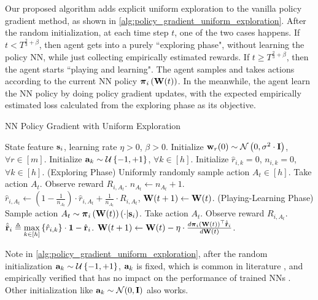 Our proposed algorithm adds explicit uniform exploration to the vanilla policy gradient method, as shown in \cref{alg:policy_gradient_uniform_exploration}. After the random initialization, at each time step $t$, one of the two cases happens. If $t < T^{\frac{2}{3} + \beta}$, then agent gets into a purely ``exploring phase", without learning the policy NN, while just collecting empirically estimated rewards. If $t \ge T^{\frac{2}{3} + \beta}$, then the agent starts ``playing and learning". The agent samples and takes actions according to the current NN policy ${\boldsymbol{\pi}}_{i}\left({\mathbf{W}}(t)\right)$. In the meanwhile, the agent learn the NN policy by doing policy gradient updates, with the expected empirically estimated loss calculated from the exploring phase as its objective.

\begin{algorithm}[t]
   \caption{NN Policy Gradient with Uniform Exploration}
\label{alg:policy_gradient_uniform_exploration}
\begin{algorithmic}
    State feature ${\mathbf{s}}_i$, learning rate $\eta > 0$, $\beta > 0$.
   \STATE Initialize ${\mathbf{w}}_r(0) \sim {\mathcal{N}}\left( 0, \sigma^2 \cdot {\mathbf{I}} \right)$, $\forall r \in [m]$. \STATE Initialize ${\mathbf{a}}_k \sim {\mathcal{U}}\left\{-1, +1\right\}$, $\forall k \in [h]$.
   \STATE Initialize $\hat{r}_{i,k} = 0$, $n_{i,k} = 0$, $\forall k \in [h]$.
   \STATE (Exploring Phase)
   \STATE Uniformly randomly sample action $A_{t} \in [h]$.
   \STATE Take action $A_{t}$.  Observe reward $R_{i, A_{t}}$.
   \STATE $n_{A_{t}} \leftarrow n_{A_{t}} + 1$.
   \STATE $\hat{r}_{i,A_{t}} \leftarrow \left( 1 - \frac{1}{n_{A_{t}}} \right) \cdot \hat{r}_{i,A_{t}} + \frac{1}{n_{A_{t}}} \cdot R_{i, A_{t}}$, 
   \STATE ${\mathbf{W}}(t+1) \leftarrow {\mathbf{W}}(t)$.
   \ELSE
   \STATE (Playing-Learning Phase)
   \STATE Sample action $A_{t} \sim {\boldsymbol{\pi}}_{i}\left({\mathbf{W}}(t)\right)\left(\cdot \middle| {\mathbf{s}}_i \right)$.
   \STATE Take action $A_{t}$. Observe reward $R_{i, A_{t}}$.
   \STATE $\hat{{\tilde{\mathbf{r}}}}_i \triangleq \max\limits_{k \in [h]}{\left\{ \hat{r}_{i, k} \right\}} \cdot {\mathbf{1}} - {\hat{\mathbf{r}}}_i$.
   \STATE ${\mathbf{W}}(t+1) \leftarrow {\mathbf{W}}(t) - \eta \cdot \frac{d {\boldsymbol{\pi}}_{i}\left({\mathbf{W}}(t)\right)^\top \hat{{\tilde{\mathbf{r}}}}_i}{d {\mathbf{W}}(t)}$.
   \ENDIF
   \ENDFOR
\end{algorithmic}
\end{algorithm}

Note in \cref{alg:policy_gradient_uniform_exploration}, after the random initialization ${\mathbf{a}}_k \sim {\mathcal{U}}\left\{-1, +1\right\}$, ${\mathbf{a}}_k$ is fixed, which is common in literature \citep{li2018learning,du2018gradientA,du2018gradientB,allen2018convergenceA,allen2018convergenceB}, and empirically verified that has no impact on the performance of trained NNs \citep{hoffer2018fix}. Other initialization like ${\mathbf{a}}_k \sim {\mathcal{N}}(0, {\mathbf{I}})$ also works.

